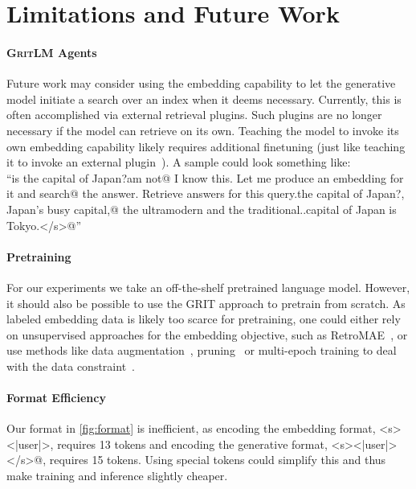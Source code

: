 \documentclass{article}
\newcommand{\model}{\textsc{GritLM}}
\newcommand{\method}{\textsc{GRIT}}
\begin{document}
\section{Limitations and Future Work}
\label{sec:limits}

\paragraph{\model{} Agents} Future work may consider using the embedding capability to let the generative model initiate a search over an index when it deems necessary. Currently, this is often accomplished via external retrieval plugins. Such plugins are no longer necessary if the model can retrieve on its own. Teaching the model to invoke its own embedding capability likely requires additional finetuning (just like teaching it to invoke an external plugin~\cite{schick2023toolformer}). A sample could look something like:\\``\nWhat is the capital of Japan?\nI am not@ \verb@sure I know this. Let me produce an embedding for it and search@ \verb@for the answer. Retrieve answers for this query.\nWhat@ \verb@is the capital of Japan?\nTokyo, Japan’s busy capital,@ \verb@mixes the ultramodern and the traditional..\n@ \verb@The capital of Japan is Tokyo.\n</s>@''

\paragraph{Pretraining} For our experiments we take an off-the-shelf pretrained language model. However, it should also be possible to use the \method{} approach to pretrain from scratch. As labeled embedding data is likely too scarce for pretraining, one could either rely on unsupervised approaches for the embedding objective, such as RetroMAE~\cite{xiao2022retromae,xiao2022retromae2}, or use methods like data augmentation~\cite{dhole2022nlaugmenter}, pruning~\cite{xia2023sheared} or multi-epoch training to deal with the data constraint~\cite{muennighoff2023scaling,luukkonen2023fingpt}.

\paragraph{Format Efficiency} Our format in \autoref{fig:format} is inefficient, as encoding the embedding format, \verb@<s><|user|>\n@,  requires 13 tokens and encoding the generative format, \verb@<s><|user|>\n</s>@, requires 15 tokens. Using special tokens could simplify this and thus make training and inference slightly cheaper.
\end{document}
